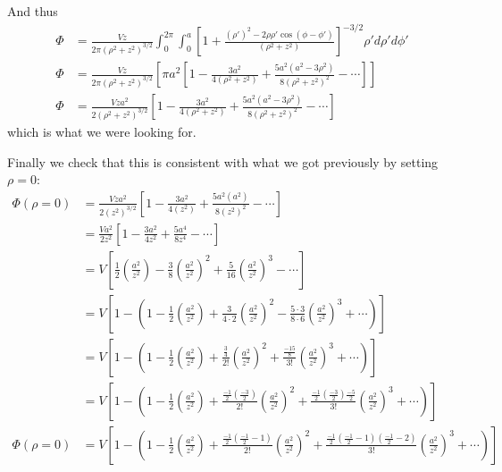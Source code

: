 \documentclass{article}
\begin{document}
And thus
\begin{align*}
\Phi &= \frac{Vz}{2\pi(\rho^{2} + z^{2})^{3/2}} \int_{0}^{2\pi}\int_{0}^{a} \left[1 + \frac{(\rho')^{2} - 2\rho\rho'\cos(\phi-\phi')}{(\rho^{2} + z^{2})}\right]^{-3/2}\rho' d\rho'd\phi'\\
\Phi &= \frac{Vz}{2\pi(\rho^{2} + z^{2})^{3/2}}\left[ \pi a^{2} \left[ 1 - \frac{3a^{2}}{4(\rho^{2} + z^{2})} + \frac{5a^{2}(a^{2} - 3\rho^{2})}{8(\rho^{2} + z^{2})^{2}} - \cdots \right] \right]\\
\Phi &= \boxed{\frac{Vza^{2}}{2(\rho^{2} + z^{2})^{3/2}}\left[ 1 - \frac{3a^{2}}{4(\rho^{2} + z^{2})} + \frac{5a^{2}(a^{2} - 3\rho^{2})}{8(\rho^{2} + z^{2})^{2}} - \cdots \right]}
\end{align*}
which is what we were looking for.

Finally we check that this is consistent with what we got previously by setting $\rho=0$:
\begin{align*}
\Phi(\rho=0) &= \frac{Vza^{2}}{2(z^{2})^{3/2}}\left[ 1 - \frac{3a^{2}}{4(z^{2})} + \frac{5a^{2}(a^{2})}{8(z^{2})^{2}} - \cdots \right]\\
&= \frac{Va^{2}}{2z^{2}}\left[ 1 - \frac{3a^{2}}{4z^{2}} + \frac{5a^{4}}{8z^{4}} - \cdots \right]\\
&= V\left[ \frac{1}{2}\left(\frac{a^{2}}{z^{2}}\right) - \frac{3}{8}\left(\frac{a^{2}}{z^{2}}\right)^{2} + \frac{5}{16}\left(\frac{a^{2}}{z^{2}}\right)^{3} - \cdots \right]\\
&= V\left[ 1 - \left( 1 - \frac{1}{2}\left(\frac{a^{2}}{z^{2}}\right) + \frac{3}{4\cdot2}\left(\frac{a^{2}}{z^{2}}\right)^{2} - \frac{5\cdot3}{8\cdot6}\left(\frac{a^{2}}{z^{2}}\right)^{3} + \cdots \right)\right]\\
&= V\left[ 1 - \left( 1 - \frac{1}{2} \left(\frac{a^{2}}{z^{2}}\right) + \frac{\frac{3}{4}}{2!} \left(\frac{a^{2}}{z^{2}}\right)^{2} + \frac{\frac{-15}{8}}{3!} \left(\frac{a^{2}}{z^{2}}\right)^{3} + \cdots \right)\right]\\
&= V\left[ 1 - \left( 1 - \frac{1}{2} \left(\frac{a^{2}}{z^{2}}\right) + \frac{\frac{-1}{2}(\frac{-3}{2})}{2!} \left(\frac{a^{2}}{z^{2}}\right)^{2} + \frac{\frac{-1}{2}(\frac{-3}{2})\frac{-5}{2}}{3!} \left(\frac{a^{2}}{z^{2}}\right)^{3} + \cdots \right)\right]\\
\Phi(\rho=0) &= V\left[ 1 - \left( 1 - \frac{1}{2} \left(\frac{a^{2}}{z^{2}}\right) + \frac{\frac{-1}{2}(\frac{-1}{2}-1)}{2!} \left(\frac{a^{2}}{z^{2}}\right)^{2} + \frac{\frac{-1}{2}(\frac{-1}{2}-1)(\frac{-1}{2}-2)}{3!}\left(\frac{a^{2}}{z^{2}}\right)^{3} + \cdots \right)\right]
\end{align*}
\end{document}
